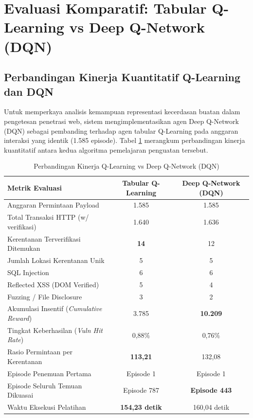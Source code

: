 \section{Evaluasi Komparatif: Tabular Q-Learning vs Deep Q-Network (DQN)}

\subsection{Perbandingan Kinerja Kuantitatif Q-Learning dan DQN}

Untuk memperkaya analisis kemampuan representasi kecerdasan buatan dalam pengetesan penetrasi web, sistem mengimplementasikan agen Deep Q-Network (DQN) sebagai pembanding terhadap agen tabular Q-Learning pada anggaran interaksi yang identik (1.585 episode). Tabel \ref{tab:comparison_ql_dqn} merangkum perbandingan kinerja kuantitatif antara kedua algoritma pemelajaran penguatan tersebut.

\begin{table}[H]
\centering
\caption{Perbandingan Kinerja Q-Learning vs Deep Q-Network (DQN)}
\label{tab:comparison_ql_dqn}
\begin{tabular}{|l|c|c|}
\hline
\textbf{Metrik Evaluasi} & \textbf{Tabular Q-Learning} & \textbf{Deep Q-Network (DQN)} \\
\hline
Anggaran Permintaan Payload & 1.585 & 1.585 \\
Total Transaksi HTTP (w/ verifikasi) & 1.640 & 1.636 \\ 
Kerentanan Terverifikasi Ditemukan & \textbf{14} & 12 \\ 
Jumlah Lokasi Kerentanan Unik & 5 & 5 \\
SQL Injection & 6 & 6 \\
Reflected XSS (DOM Verified) & 5 & 4 \\ 
Fuzzing / File Disclosure & 3 & 2 \\
Akumulasi Insentif (\textit{Cumulative Reward}) & 3.785 & \textbf{10.209} \\ 
Tingkat Keberhasilan (\textit{Vuln Hit Rate}) & 0,88\% & 0,76\% \\ 
Rasio Permintaan per Kerentanan & \textbf{113,21} & 132,08 \\ 
Episode Penemuan Pertama & Episode 1 & Episode 1 \\
Episode Seluruh Temuan Dikuasai & Episode 787 & \textbf{Episode 443} \\
Waktu Eksekusi Pelatihan & \textbf{154,23 detik} & 160,04 detik \\ 
\hline
\end{tabular}
\end{table}

